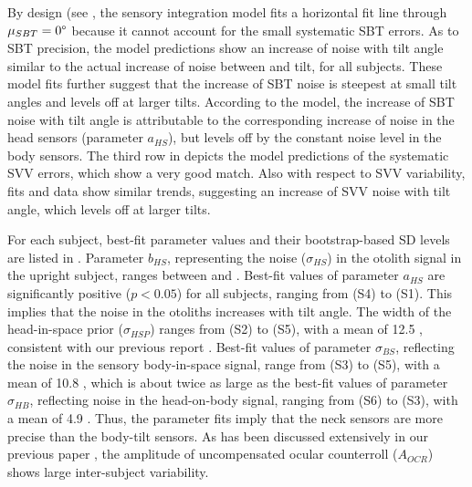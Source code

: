 By design (see , the sensory integration model fits a horizontal fit line through $\mu_{SBT} = 0\degree$ because it cannot account for the small systematic SBT errors. As to SBT precision, the model predictions show an increase of noise with tilt angle similar to the actual increase of noise between  and  tilt, for all subjects. These model fits further suggest that the increase of SBT noise is steepest at small tilt angles and levels off at larger tilts. According to the model, the increase of SBT noise with tilt angle is attributable to the corresponding increase of noise in the head sensors (parameter $a_{HS}$), but levels off by the constant noise level in the body sensors. The third row in  depicts the model predictions of the systematic SVV errors, which show a very good match. Also with respect to SVV variability, fits and data show similar trends, suggesting an increase of SVV noise with tilt angle, which levels off at larger tilts.

For each subject, best-fit parameter values and their bootstrap-based SD levels are listed in . Parameter $b_{HS}$, representing the noise ($\sigma_{HS}$) in the otolith signal in the upright subject, ranges between  and . Best-fit values of parameter $a_{HS}$ are significantly positive ($p < 0.05$) for all subjects, ranging from  (S4) to  (S1). This implies that the noise in the otoliths increases with tilt angle. The width of the head-in-space prior ($\sigma_{HSP}$) ranges from  (S2) to  (S5), with a mean of 12.5 \textpm {}, consistent with our previous report \cite{devrijer2009}. Best-fit values of parameter $\sigma_{BS}$, reflecting the noise in the sensory body-in-space signal, range from  (S3) to  (S5), with a mean of 10.8 \textpm {}, which is about twice as large as the best-fit values of parameter $\sigma_{HB}$, reflecting noise in the head-on-body signal, ranging from  (S6) to  (S3), with a mean of 4.9 \textdegree. Thus, the parameter fits imply that the neck sensors are more precise than the body-tilt sensors. As has been discussed extensively in our previous paper \cite{devrijer2009}, the amplitude of uncompensated ocular counterroll ($A_{OCR}$) shows large inter-subject variability.

